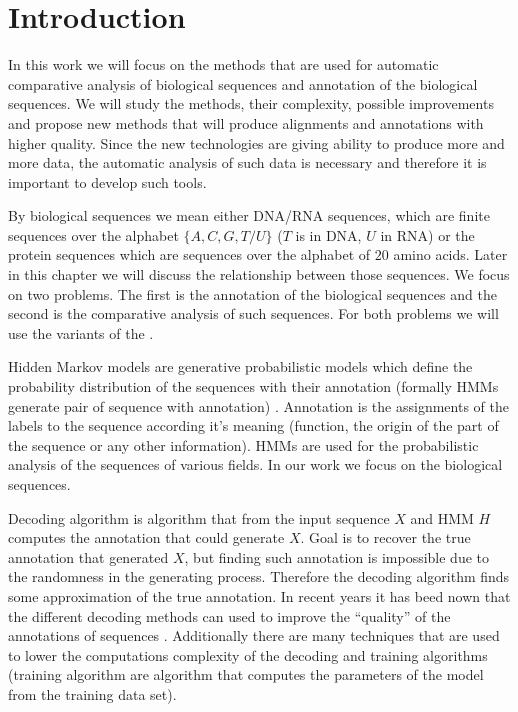 \chapter{Introduction}


In this work we will focus on the methods that are used for automatic
comparative analysis of biological sequences and annotation of the biological
sequences. We will study the methods, their complexity, possible improvements
and propose new methods that will produce alignments and annotations with higher
quality. Since the new technologies are giving ability to produce more and more
data, the automatic analysis of such data is necessary and therefore it is
important to develop such tools.

By biological sequences we mean either DNA/RNA sequences, which are finite
sequences over the alphabet $\{A,C,G,T/U\}$ ($T$ is in DNA, $U$ in RNA) or the
protein sequences which are sequences over the alphabet of $20$ amino acids.
Later in this chapter we will discuss the relationship between those sequences.
We focus on two problems. The first is the annotation of the biological
sequences and the second is the comparative analysis of such sequences. For both 
problems we will use the variants of the .

Hidden Markov models are generative probabilistic models which define the
probability distribution of the sequences with their annotation (formally HMMs
generate pair of sequence with annotation) \cite{Durbin1998}. Annotation is
the assignments of the labels to the sequence according it's meaning (function,
the origin of the part of the sequence or any other information). HMMs are used
for the probabilistic analysis of the sequences of various fields. In our work
we focus on  the biological sequences. 

Decoding algorithm is algorithm that from the input sequence $X$ and HMM $H$
computes the annotation that could generate $X$. Goal is to recover the true
annotation that generated $X$, but finding such annotation is impossible due to
the randomness in the generating process. Therefore the decoding algorithm finds
some approximation of the true annotation.  In recent years it has beed nown
that the different decoding methods can used to improve the ``quality'' of the
annotations of sequences
\cite{Gross2007,Nanasi2010,Nanasi2010mgr,Truszkowski2011}.  Additionally there
are many techniques that are used to lower the computations complexity of the
decoding and training algorithms (training algorithm are algorithm that computes
the parameters of the model from the training data set).

